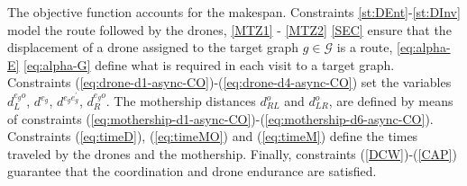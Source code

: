 \documentclass[10pt,a4paper]{elsarticle}
\newcommand{\EN}[1]{{\color{black}#1}}
\begin{document}
\noindent
The objective function accounts for the makespan. Constraints \eqref{st:DEnt}-\eqref{st:DInv} model the route followed by the drones, \eqref{MTZ1} - \eqref{MTZ2}  \eqref{SEC} ensure that the displacement of a drone  assigned to the target graph $g\in\mathcal G$ is a route, \eqref{eq:alpha-E}  \eqref{eq:alpha-G} define what is required in each visit to a target graph. Constraints (\ref{eq:drone-d1-async-CO})-(\ref{eq:drone-d4-async-CO}) set the variables $d_L^{e_go}$, $d^{e_g}$, $d^{e_ge^\prime_g}$, $d_R^{e_go}$.
The mothership distances $d_{RL}^o$ and $d_{LR}^o$, are defined by means of constraints (\ref{eq:mothership-d1-async-CO})-(\ref{eq:mothership-d6-async-CO}). Constraints (\ref{eq:timeD}), (\ref{eq:timeMO}) and (\ref{eq:timeM}) define the \EN{times traveled} by the drones and the mothership. Finally, constraints (\ref{DCW})-(\ref{CAP}) guarantee that the coordination and drone endurance are satisfied. 
\end{document}
